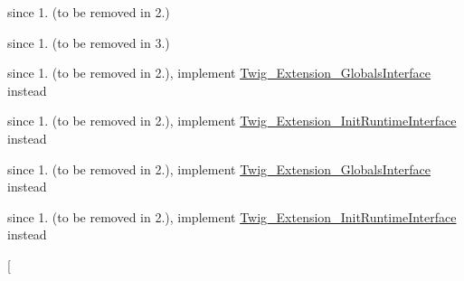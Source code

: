 \begin{DoxyRefList}
\item[\label{deprecated__deprecated000011}%
\hypertarget{deprecated__deprecated000011}{}%
Global(e) \hyperlink{class_twig___environment_afef0e86e8f08fa1d0c4006ce65bede10}{Twig\+\_\+\+Environment\+:\+:write\+Cache\+File} (\$file, \$content)]since 1. (to be removed in 2.)  
\item[\label{deprecated__deprecated000012}%
\hypertarget{deprecated__deprecated000012}{}%
Classe \hyperlink{interface_twig___exists_loader_interface}{Twig\+\_\+\+Exists\+Loader\+Interface} ]since 1. (to be removed in 3.)  
\item[\label{deprecated__deprecated000014}%
\hypertarget{deprecated__deprecated000014}{}%
Global(e) \hyperlink{class_twig___extension_ae3a26252ce6efe503698085a7ed69dad}{Twig\+\_\+\+Extension\+:\+:get\+Globals} ()]since 1. (to be removed in 2.), implement \hyperlink{interface_twig___extension___globals_interface}{Twig\+\_\+\+Extension\+\_\+\+Globals\+Interface} instead  
\item[\label{deprecated__deprecated000013}%
\hypertarget{deprecated__deprecated000013}{}%
Global(e) \hyperlink{class_twig___extension_ab17a2e5ce3e5789febe1f3a96e61ec38}{Twig\+\_\+\+Extension\+:\+:init\+Runtime} (\hyperlink{class_twig___environment}{Twig\+\_\+\+Environment} \$environment)]since 1. (to be removed in 2.), implement \hyperlink{interface_twig___extension___init_runtime_interface}{Twig\+\_\+\+Extension\+\_\+\+Init\+Runtime\+Interface} instead  
\item[\label{deprecated__deprecated000016}%
\hypertarget{deprecated__deprecated000016}{}%
Global(e) \hyperlink{interface_twig___extension_interface_ae3a26252ce6efe503698085a7ed69dad}{Twig\+\_\+\+Extension\+Interface\+:\+:get\+Globals} ()]since 1. (to be removed in 2.), implement \hyperlink{interface_twig___extension___globals_interface}{Twig\+\_\+\+Extension\+\_\+\+Globals\+Interface} instead  
\item[\label{deprecated__deprecated000015}%
\hypertarget{deprecated__deprecated000015}{}%
Global(e) \hyperlink{interface_twig___extension_interface_ab17a2e5ce3e5789febe1f3a96e61ec38}{Twig\+\_\+\+Extension\+Interface\+:\+:init\+Runtime} (\hyperlink{class_twig___environment}{Twig\+\_\+\+Environment} \$environment)]since 1. (to be removed in 2.), implement \hyperlink{interface_twig___extension___init_runtime_interface}{Twig\+\_\+\+Extension\+\_\+\+Init\+Runtime\+Interface} instead  
\item[\label{deprecated__deprecated000020}%
\hypertarget{deprecated__deprecated000020}{}%

\end{DoxyRefList}
